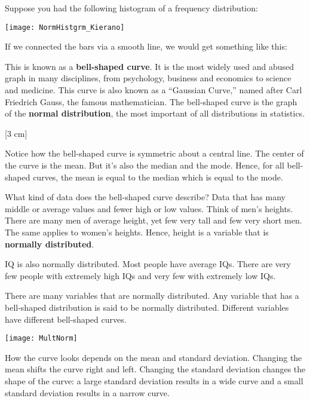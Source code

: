 \setcounter{ExampleCounter}{1}
Suppose you had the following histogram of a frequency distribution:
\begin{center}
\texttt{[image: NormHistgrm\_Kierano]}
\end{center}
If we connected the bars via a smooth line, we would get something like this:
\begin{center}
\end{center}
This is known as a \textbf{bell-shaped curve}. It is the most widely used and abused graph in many disciplines, from psychology, business and economics to science and medicine. This curve is also known as a ``Gaussian Curve,'' named after Carl Friedrich Gauss, the famous mathematician. The bell-shaped curve is the graph of the \textbf{normal distribution}, the most important of all distributions in statistics. 

[3 cm]

Notice how the bell-shaped curve is symmetric about a central line. The center of the curve is the mean. But it's also the median and the mode. Hence, for all bell-shaped curves, the mean is equal to the median which is equal to the mode. 

What kind of data does the bell-shaped curve describe? Data that has many middle or average values and fewer high or low values. Think of men's heights. There are many men of average height, yet few very tall and few very short men. The same applies to women's heights. Hence, height is a variable that is \textbf{normally distributed}. 

IQ is also normally distributed. Most people have average IQs. There are very few people with extremely high IQs and very few with extremely low IQs. 

There are many variables that are normally distributed. Any variable that has a bell-shaped distribution is said to be normally distributed. Different variables have different bell-shaped curves. 
\begin{center}
\texttt{[image: MultNorm]}
\end{center}
How the curve looks depends on the mean and standard deviation. Changing the mean shifts the curve right and left. Changing the standard deviation changes the shape of the curve: a large standard deviation results in a wide curve and a small standard deviation results in a narrow curve. 

